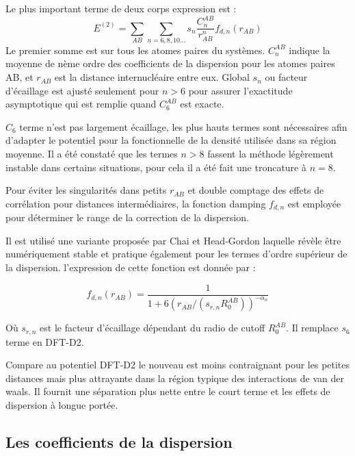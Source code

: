 	Le plus important terme de deux corps expression est :
	\begin{equation}
	E^{(2)} = \sum_{AB} \sum_{n=6,8,10...} s_{n}\frac{C_{n}^{AB}}{r^{n}_{AB}} f_{d,n} (r_{AB})
	\end{equation}
	Le premier somme est sur tous les atomes paires du systèmes. $C_{n}^{AB}$ indique la moyenne de nème ordre des coefficients de la dispersion pour les atomes paires AB, et $r_{AB}$ est la distance internucléaire entre eux. Global $s_{n}$ ou facteur d'écaillage est ajusté seulement pour $n>6$ pour assurer l'exactitude asymptotique qui est remplie quand $C_{6}^{AB}$ est exacte. 
	\bigskip
	
	$C_{6}$ terme n'est pas largement écaillage, les plus hauts termes sont nécessaires afin d'adapter le potentiel pour la fonctionnelle de la densité utilisée dans sa région moyenne. Il a été constaté que les termes $n>8$ fassent la méthode légèrement instable dans certains situations, pour cela il a été fait une troncature à $n=8$.
	\bigskip
	
	Pour éviter les singularités dans petits $r_{AB}$ et double comptage des effets de corrélation pour distances intermédiaires, la fonction damping $f_{d,n}$ est employée pour déterminer le range de la correction de la dispersion.
	\bigskip
	
	Il est utilisé une variante proposée par Chai et Head-Gordon\cite{chai2008long} laquelle révèle être numériquement stable et pratique également pour les termes d'ordre supérieur de la dispersion. l'expression de cette fonction est donnée par :
	
	\begin{equation}
	f_{d,n} (r_{AB}) = \frac{1}{1+ 6(r_{AB}/(s_{r,n}R_{0}^{AB}))^{-\alpha_{n}}}
	\end{equation}
	\bigskip
	
	Où $s_{r,n}$ est le facteur d'écaillage dépendant du radio de cutoff $R_{0}^{AB}$. Il remplace $s_{6}$ terme en DFT-D2. 
	\bigskip
	
	Compare au potentiel DFT-D2 le nouveau est moins contraignant pour les petites distances
	mais plus attrayante dans la région typique des interactions de van der waals. Il fournit une séparation plus nette entre le court terme et les effets de dispersion à longue portée.
	
	\subsection{Les coefficients de la dispersion}
	
